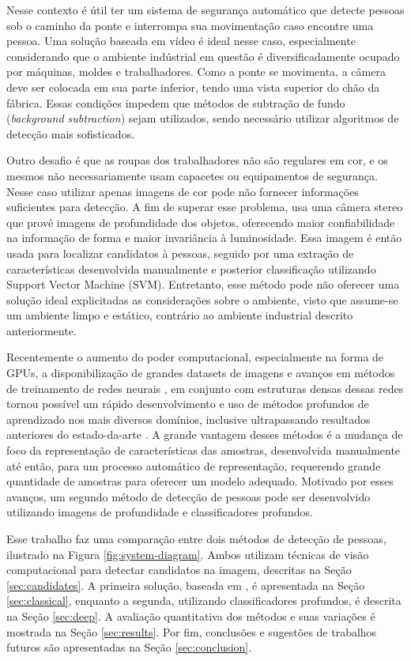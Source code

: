   Nesse contexto é útil ter um sistema de segurança automático que detecte pessoas sob o caminho da ponte e interrompa sua movimentação caso encontre uma pessoa. Uma solução baseada em vídeo é ideal nesse caso, especialmente considerando que o ambiente indústrial em questão é diversificadamente ocupado por máquinas, moldes e trabalhadores. Como a ponte se movimenta, a câmera deve ser colocada em sua parte inferior, tendo uma vista superior do chão da fábrica. Essas condições impedem que métodos de subtração de fundo (\textit{background subtraction}) sejam utilizados, sendo necessário utilizar algoritmos de detecção mais sofisticados.

  Outro desafio é que as roupas dos trabalhadores não são regulares em cor, e os mesmos não necessariamente usam capacetes ou equipamentos de segurança. Nesse caso utilizar apenas imagens de cor pode não fornecer informações suficientes para detecção. A fim de superar esse problema, \cite{rauter} usa uma câmera stereo que provê imagens de profundidade dos objetos, oferecendo maior confiabilidade na informação de forma e maior invariância à luminosidade. Essa imagem é então usada para localizar candidatos à pessoas, seguido por uma extração de características desenvolvida manualmente e posterior classificação utilizando Support Vector Machine (SVM). Entretanto, esse método pode não oferecer uma solução ideal explicitadas as considerações sobre o ambiente, visto que assume-se um ambiente limpo e estático, contrário ao ambiente industrial descrito anteriormente.

  Recentemente o aumento do poder computacional, especialmente na forma de GPUs, a disponibilização de grandes datasets de imagens e avanços em métodos de treinamento de redes neurais \cite{nair2010relu}, em conjunto com estruturas densas dessas redes \cite{NIPS2013_5207} tornou possível um rápido desenvolvimento e uso de métodos profundos de aprendizado nos mais diversos domínios, inclusive ultrapassando resultados anteriores do estado-da-arte \cite{hintonCONVNET}. A grande vantagem desses métodos é a mudança de foco da representação de características das amostras, desenvolvida manualmente até então, para um processo automático de representação, requerendo grande quantidade de amostras para oferecer um modelo adequado. Motivado por esses avanços, um segundo método de detecção de pessoas pode ser desenvolvido utilizando imagens de profundidade e classificadores profundos.

  Esse trabalho faz uma comparação entre dois métodos de detecção de pessoas, ilustrado na Figura \ref{fig:system-diagram}. Ambos utilizam técnicas de visão computacional para detectar candidatos na imagem, descritas na Seção \ref{sec:candidates}. A primeira solução, baseada em \cite{rauter}, é apresentada na Seção \ref{sec:classical}, enquanto a segunda, utilizando classificadores profundos, é descrita na Seção \ref{sec:deep}. A avaliação quantitativa dos métodos e suas variações é mostrada na Seção \ref{sec:results}. Por fim, conclusões e sugestões de trabalhos futuros são apresentadas na Seção \ref{sec:conclusion}.

